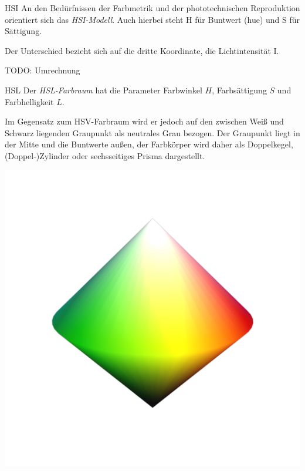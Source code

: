 \begin{defi}[Farbmodell]{HSI}
    An den Bedürfnissen der Farbmetrik und der phototechnischen Reproduktion orientiert sich das \emph{HSI-Modell}.
    Auch hierbei steht H für Buntwert (hue) und S für Sättigung.

    Der Unterschied bezieht sich auf die dritte Koordinate, die Lichtintensität I.

    TODO: Umrechnung
\end{defi}

\begin{bonus}[Farbmodell]{HSL}
    Der \emph{HSL-Farbraum} hat die Parameter Farbwinkel $H$, Farbsättigung $S$ und Farbhelligkeit $L$.

    Im Gegensatz zum HSV-Farbraum wird er jedoch auf den zwischen Weiß und Schwarz liegenden Graupunkt als neutrales Grau bezogen.
    Der Graupunkt liegt in der Mitte und die Buntwerte außen, der Farbkörper wird daher als Doppelkegel, (Doppel-)Zylinder oder sechsseitiges Prisma dargestellt.

    \centering
    \includegraphics[width=.4\linewidth]{figures/HSL_cone.png}
\end{bonus}

